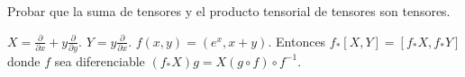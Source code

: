\documentclass[twoside]{article}
\begin{document}
\newpage

\begin{ejercicio}{}
Probar que la suma de tensores y el producto tensorial de tensores son tensores.
\end{ejercicio}
\begin{solucion}
\end{solucion}

\newpage

\begin{ejercicio}{}
$X=\frac{\partial}{\partial x} +y \frac{\partial}{\partial y}$. $Y=y\frac{\partial}{\partial x}$. $f(x,y)=(e^x,x+y)$. Entonces $f_\ast[X,Y]	=[f_\ast X,f_\ast Y]$ donde $f$ sea diferenciable $(f_\ast X)g = X(g\circ f)\circ f^{-1}$.
\end{ejercicio}
\begin{solucion}
\end{solucion}
\end{document}
